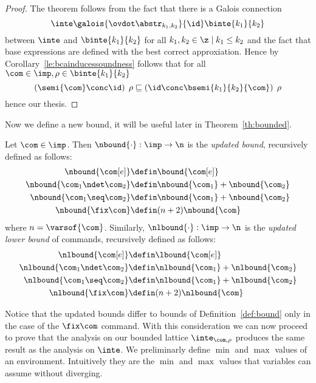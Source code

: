 \begin{proof}
  The theorem follows from the fact that there is a Galois connection
  \begin{equation*}
    \inte\galois{\ovdot\abstr_{k_1, k_2}}{\id}\binte{k_1}{k_2}
  \end{equation*}
  between \(\inte\) and \(\binte{k_1}{k_2}\) for all
  \(k_1, k_2 \in \z \mid k_1 \leq k_2\) and the fact that base
  expressions are defined with the best correct approxiation. Hence by
  Corollary~\ref{le:bcainducessoundness} follows that for all
  \(\com\in\imp, \rho \in \binte{k_1}{k_2}\)
  \begin{equation*}
    \left(\semi{\com} \conc \id \right)\;\rho \sqsubseteq  \left(\id \conc \bsemi{k_1}{k_2}{\com}\right)\;\rho
  \end{equation*}
  hence our thesis.
\end{proof}

Now we define a new bound, it will be useful later in
Theorem~\ref{th:bounded}.

\begin{definition}\label{def:newbound}
  Let \(\com\in\imp\). Then \(\nbound{\cdot} : \imp \to \n\) is the
  \emph{updated bound}, recursively defined as follows:
  \begin{align*}
    \nbound{\com[e]} & \defin \bound{\com[e]} \\
    \nbound{\com_1 \ndet \com_2} & \defin \nbound{\com_1} + \nbound{\com_2} \\
    \nbound{\com_1 \seq \com_2} & \defin \nbound{\com_1} + \nbound{\com_2} \\
    \nbound{\fix\com} & \defin (n+2)\nbound{\com} \\
  \end{align*}
  where \(n = \varsof{\com}\). Similarly,
  \(\nlbound{\cdot} : \imp \to \n\) is the \emph{updated lower bound}
  of commands, recursively defined as follows:
  \begin{align*}
    \nlbound{\com[e]} & \defin \lbound{\com[e]} \\
    \nlbound{\com_1 \ndet \com_2} & \defin \nlbound{\com_1} + \nlbound{\com_2} \\
    \nlbound{\com_1 \seq \com_2} & \defin \nlbound{\com_1} + \nlbound{\com_2} \\
    \nlbound{\fix\com} & \defin (n+2)\nlbound{\com} \\
  \end{align*}
\end{definition}

Notice that the updated bounds differ to bounds of
Definition~\ref{def:bound} only in the case of the \(\fix\com\)
command.  With this consideration we can now proceed to prove that the
analysis on our bounded lattice \(\inte_{\com,\rho}\) produces the
same result as the analysis on \(\inte\).  We preliminarly define
\(\min\) and \(\max\) values of an environment. Intuitively they are
the \(\min\) and \(\max\) values that variables can assume without
diverging.

